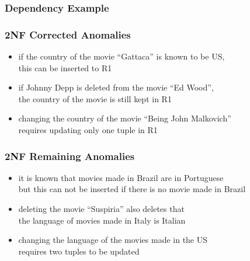 \documentclass[dvipsnames]{beamer}
\begin{document}
\begin{frame}
  \frametitle{Dependency Example}

  \begin{center}
  \end{center}
\end{frame}

\begin{frame}
  \frametitle{2NF Corrected Anomalies}

  \hyperlink{example_db_2}{}

  \begin{itemize}
    \item if the country of the movie ``Gattaca'' is known to be US,\\
      this can be inserted to R1

    \pause
    \medskip
    \item if Johnny Depp is deleted from the movie ``Ed Wood'',\\
      the country of the movie is still kept in R1

    \pause
    \medskip
    \item changing the country of the movie ``Being John Malkovich''\\
      requires updating only one tuple in R1
  \end{itemize}
\end{frame}

\begin{frame}
  \frametitle{2NF Remaining Anomalies}

  \hyperlink{example_db_2}{}

  \begin{itemize}
    \item it is known that movies made in Brazil are in Portuguese\\
      but this can not be inserted if there is no movie made in Brazil

    \pause
    \medskip
    \item deleting the movie ``Suspiria'' also deletes that\\
      the language of movies made in Italy is Italian

    \pause
    \medskip
    \item changing the language of the movies made in the US\\
      requires two tuples to be updated
  \end{itemize}
\end{frame}
\end{document}
